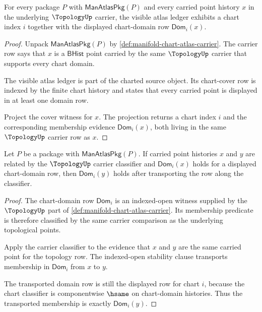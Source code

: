 \begin{theorem}
\label{thm:manifoldup-chart-cover-coverage}
For every package $P$ with $\mathsf{ManAtlasPkg}(P)$ and every carried point
history $x$ in the underlying $\TopologyUp$ carrier, the visible atlas ledger
exhibits a chart index $i$ together with the displayed chart-domain row
$\mathsf{Dom}_i(x)$.
\end{theorem}
\begin{proof}
Unpack $\mathsf{ManAtlasPkg}(P)$ by
\autoref{def:manifold-chart-atlas-carrier}. The carrier row says that $x$ is a
$\mathsf{BHist}$ point carried by the same $\TopologyUp$ carrier that supports
every chart domain.

The visible atlas ledger is part of the charted source object. Its chart-cover
row is indexed by the finite chart history and states that every carried point
is displayed in at least one domain row.

Project the cover witness for $x$. The projection returns a chart index $i$
and the corresponding membership evidence $\mathsf{Dom}_i(x)$, both living in
the same $\TopologyUp$ carrier row as $x$.
\end{proof}

\begin{theorem}
\label{thm:manifoldup-chart-domain-carrier-transport}
Let $P$ be a package with $\mathsf{ManAtlasPkg}(P)$. If carried point histories
$x$ and $y$ are related by the $\TopologyUp$ carrier classifier and
$\mathsf{Dom}_i(x)$ holds for a displayed chart-domain row, then
$\mathsf{Dom}_i(y)$ holds after transporting the row along the classifier.
\end{theorem}
\begin{proof}
The chart-domain row $\mathsf{Dom}_i$ is an indexed-open witness supplied by
the $\TopologyUp$ part of
\autoref{def:manifold-chart-atlas-carrier}. Its membership predicate is
therefore classified by the same carrier comparison as the underlying
topological points.

Apply the carrier classifier to the evidence that $x$ and $y$ are the same
carried point for the topology row. The indexed-open stability clause transports
membership in $\mathsf{Dom}_i$ from $x$ to $y$.

The transported domain row is still the displayed row for chart $i$, because
the chart classifier is componentwise $\hsame$ on chart-domain histories. Thus
the transported membership is exactly $\mathsf{Dom}_i(y)$.
\end{proof}

